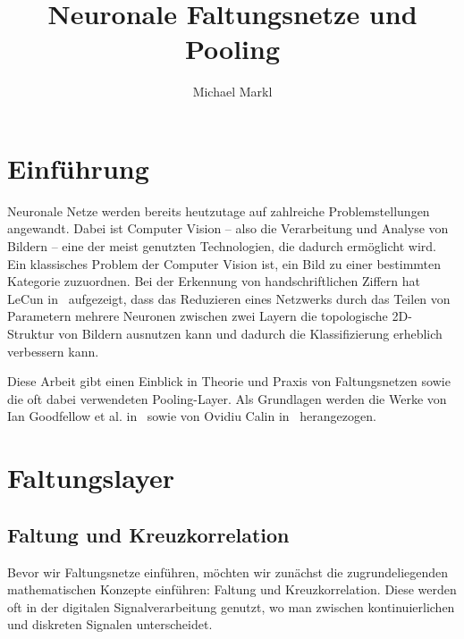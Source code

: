\documentclass{article}
\title{Neuronale Faltungsnetze und Pooling}
\author{Michael Markl}
\theoremstyle{definition}
\begin{document}
\maketitle


\section{Einführung}

Neuronale Netze werden bereits heutzutage auf zahlreiche Problemstellungen angewandt.
Dabei ist Computer Vision -- also die Verarbeitung und Analyse von Bildern -- eine der meist genutzten Technologien, die dadurch ermöglicht wird.
Ein klassisches Problem der Computer Vision ist, ein Bild zu einer bestimmten Kategorie zuzuordnen.
Bei der Erkennung von handschriftlichen Ziffern hat LeCun in~\cite{LeCun1989} aufgezeigt, dass das Reduzieren eines Netzwerks durch das Teilen von Parametern mehrere Neuronen zwischen zwei Layern die topologische 2D-Struktur von Bildern ausnutzen kann und dadurch die Klassifizierung erheblich verbessern kann.

Diese Arbeit gibt einen Einblick in Theorie und Praxis von Faltungsnetzen sowie die oft dabei verwendeten Pooling-Layer.
Als Grundlagen werden die Werke von Ian Goodfellow et al. in~\cite[Kapitel~9]{Goodfellow-et-al-2016} sowie von Ovidiu Calin in~\cite[Kapitel~15,16]{Calin2020} herangezogen.

\section{Faltungslayer}

\subsection{Faltung und Kreuzkorrelation}

Bevor wir Faltungsnetze einführen, möchten wir zunächst die zugrundeliegenden mathematischen Konzepte einführen:
Faltung und Kreuzkorrelation.
Diese werden oft in der digitalen Signalverarbeitung genutzt, wo man zwischen kontinuierlichen und diskreten Signalen unterscheidet.

\newcommand{\llambda}{\lambda}
\newcommand{\cmeasure}{\mu_c}
\end{document}
